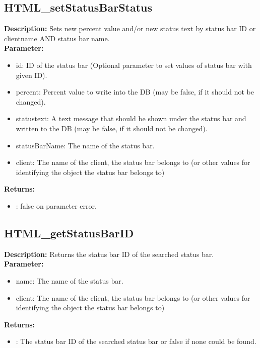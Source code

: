 \subsection{HTML\_setStatusBarStatus}
\textbf{Description:} Sets new percent value and/or new status text by status bar ID or clientname AND status bar name.\\
\textbf{Parameter:}
\begin{itemize}
\item id: ID of the status bar (Optional parameter to set values of status bar with given ID).
\item percent: Percent value to write into the DB (may be false, if it should not be changed).
\item statustext: A text message that should be shown under the status bar and written to the DB (may be false, if it should not be changed).
\item statusBarName: The name of the status bar.
\item client: The name of the client, the status bar belongs to (or other values for identifying the object the status bar belongs to)
\end{itemize}
\textbf{Returns:}
\begin{itemize}
\item : false on parameter error.
\end{itemize}

\subsection{HTML\_getStatusBarID}
\textbf{Description:} Returns the status bar ID of the searched status bar.\\
\textbf{Parameter:}
\begin{itemize}
\item name: The name of the status bar.
\item client: The name of the client, the status bar belongs to (or other values for identifying the object the status bar belongs to)
\end{itemize}
\textbf{Returns:}
\begin{itemize}
\item : The status bar ID of the searched status bar or false if none could be found.
\end{itemize}

